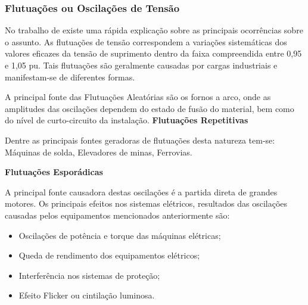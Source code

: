 \subsubsection{Flutuações ou Oscilações de Tensão}
\par
No trabalho de \cite{DEL03} existe uma rápida explicação sobre as principais ocorrências sobre o assunto. As flutuações de tensão correspondem a variações sistemáticas dos valores eficazes da tensão de suprimento dentro da faixa compreendida entre 0,95 e 1,05 pu. Tais flutuações são geralmente causadas por cargas industriais e manifestam-se de diferentes formas.
\par
A principal fonte das Flutuações Aleatórias são os fornos a arco, onde as amplitudes das oscilações dependem do estado de fusão do material, bem como do nível de curto-circuito da instalação.
\textbf{Flutuações Repetitivas}
\par Dentre as principais fontes geradoras de flutuações desta natureza tem-se: Máquinas de solda, Elevadores de minas, Ferrovias.
\par\textbf{Flutuações Esporádicas}
\par A principal fonte causadora destas oscilações é a partida direta de grandes motores. Os principais efeitos nos sistemas elétricos, resultados das oscilações causadas pelos equipamentos mencionados anteriormente são:
\begin{itemize}
\item Oscilações de potência e torque das máquinas elétricas;
\item Queda de rendimento dos equipamentos elétricos;
\item Interferência nos sistemas de proteção;
\item Efeito Flicker ou cintilação luminosa.
\end{itemize}

